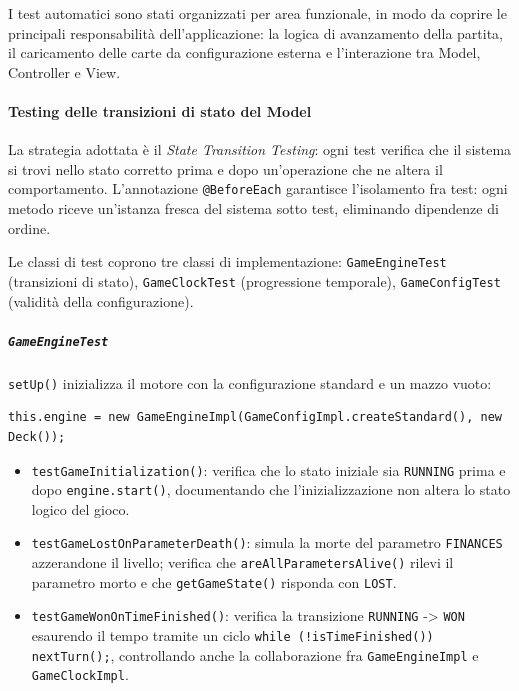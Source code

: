\documentclass[11pt, a4paper, oneside]{report}
\begin{document}
I test automatici sono stati organizzati per area funzionale, in modo da coprire
le principali responsabilità dell'applicazione: la logica di avanzamento della
partita, il caricamento delle carte da configurazione esterna e l'interazione tra
Model, Controller e View.

\paragraph{Testing delle transizioni di stato del Model}
La strategia adottata \`e il \emph{State Transition Testing}: ogni test
verifica che il sistema si trovi nello stato corretto prima e dopo
un'operazione che ne altera il comportamento. L'annotazione
\texttt{@BeforeEach} garantisce l'isolamento fra test: ogni metodo riceve
un'istanza fresca del sistema sotto test, eliminando dipendenze di ordine.

Le classi di test coprono tre classi di implementazione:
\texttt{GameEngineTest} (transizioni di stato),
\texttt{GameClockTest} (progressione temporale),
\texttt{GameConfigTest} (validit\`a della configurazione).

\subparagraph{\texttt{GameEngineTest}}
\texttt{setUp()} inizializza il motore con la configurazione standard e un
mazzo vuoto:
\begin{lstlisting}
this.engine = new GameEngineImpl(GameConfigImpl.createStandard(), new Deck());
\end{lstlisting}
\begin{itemize}
    \item \texttt{testGameInitialization()}: verifica che lo stato iniziale
        sia \texttt{RUNNING} prima e dopo \texttt{engine.start()}, documentando
        che l'inizializzazione non altera lo stato logico del gioco.
    \item \texttt{testGameLostOnParameterDeath()}: simula la morte del
        parametro \texttt{FINANCES} azzerandone il livello; verifica che
        \texttt{areAllParametersAlive()} rilevi il parametro morto e che
        \texttt{getGameState()} risponda con \texttt{LOST}.
    \item \texttt{testGameWonOnTimeFinished()}: verifica la transizione
        \texttt{RUNNING} -> \texttt{WON} esaurendo il tempo tramite un ciclo
        \texttt{while (!isTimeFinished()) nextTurn();}, controllando anche
        la collaborazione fra \texttt{GameEngineImpl} e \texttt{GameClockImpl}.
\end{itemize}
\end{document}
